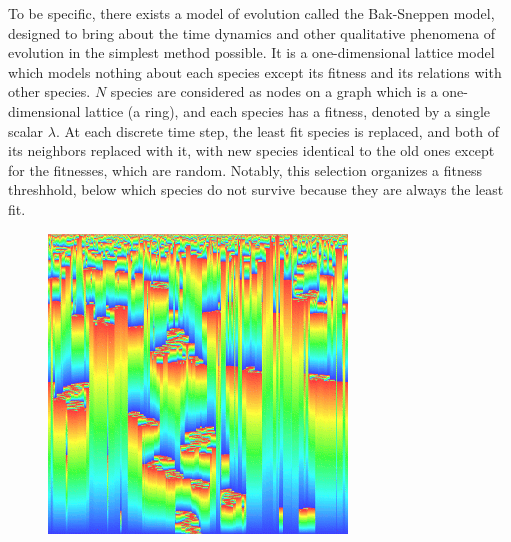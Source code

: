 \documentclass[12pt]{article}
\begin{document}
To be specific, there exists a model of evolution called the Bak-Sneppen model, designed to bring about the time dynamics and other qualitative phenomena of evolution in the simplest method possible. It is a one-dimensional lattice model which models nothing about each species except its fitness and its relations with other species. $N$ species are considered as nodes on a graph which is a one-dimensional lattice (a ring), and each species has a fitness, denoted by a single scalar $\lambda$. At each discrete time step, the least fit species is replaced, and both of its neighbors replaced with it, with new species identical to the old ones except for the fitnesses, which are random. Notably, this selection organizes a fitness threshhold, below which species do not survive because they are always the least fit.

\begin{figure}
  \includegraphics{bak_sneppen}
\end{figure}
\end{document}
